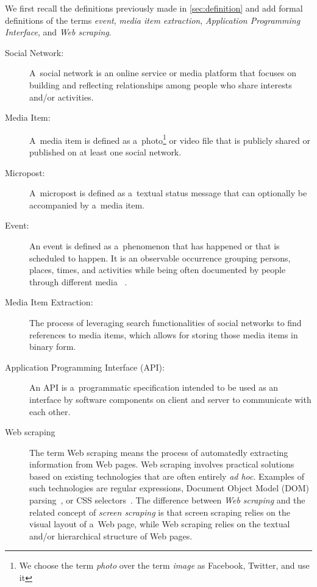 We first recall the definitions previously made in
\autoref{sec:definition} and add formal definitions
of the terms \emph{event},
\emph{media item extraction},
\emph{Application Programming Interface},
and \emph{Web scraping}.

\begin{description}
  \item[Social Network:]
       A~social network is an online service or media platform
       that focuses on building and reflecting
       relationships among people
       who share interests and/or activities.
  \item[Media Item:]
       A~media item is defined as
       a~photo\footnote{We choose the term \emph{photo}
       over the term \emph{image} as 
       Facebook, Twitter, and \googleplus use it}
       or video file that is publicly shared or published
       on at least one social network.
  \item[Micropost:]
       A~micropost is defined as a~textual status message
       that can optionally be accompanied by a~media item.
  \item[Event:]
       An event is defined as a~phenomenon that has happened
       or that is scheduled to happen.
       It is an observable occurrence grouping persons,
       places, times, and activities while being often
       documented by people through different media~%
       \cite{liu2011events}.
  \item[Media Item Extraction:]
       The process of leveraging search functionalities of
       social networks to find references to media items,
       which allows for storing those media items in binary form.       
  \item[Application Programming Interface (API):]
       An API is a~programmatic specification intended to be used
       as an interface by software components on client and server
       to communicate with each other.
  \item[Web scraping]
       The term Web scraping means the process of
       automatedly extracting information from Web pages.
       Web scraping involves practical solutions based on
       existing technologies that are often entirely \emph{ad hoc}.
       Examples of such technologies are regular expressions,
       Document Object Model (DOM)
       parsing~\cite{lehors2004dom},
       or CSS selectors~\cite{hunt2012cssselectors}.
       The difference between \emph{Web scraping}
       and the related concept of \emph{screen scraping}
       is that screen scraping relies on the visual layout of a~Web page,
       while Web scraping relies on the textual
       and/or hierarchical structure of Web pages.
\end{description}


